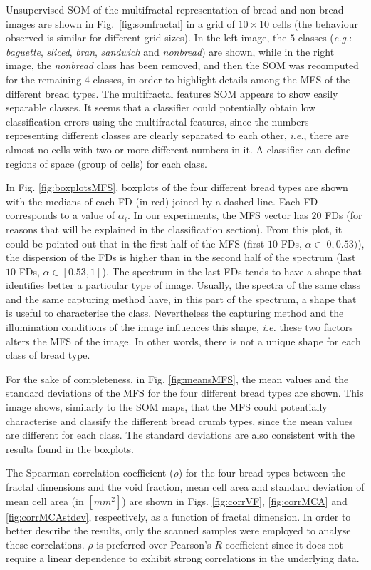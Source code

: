 \documentclass[twocolumn]{bmcart}%
\begin{document}
Unsupervised SOM of the multifractal representation of bread and non-bread images are shown in Fig.~\ref{fig:somfractal} in a grid of $10\times10$ cells (the behaviour observed is similar for different grid sizes). In the left image, the $5$ classes ({\em e.g.}: {\em baguette}, {\em sliced}, {\em bran}, {\em sandwich} and {\em nonbread}) are shown, while in the right image, the {\em nonbread} class has been removed, and then the SOM was recomputed for the remaining $4$ classes, in order to highlight details among the MFS of the different bread types. The multifractal features SOM appears to show easily separable classes. It seems that a classifier could potentially obtain low classification errors using the multifractal features, since the numbers representing different classes are clearly separated to each other, {\em i.e.}, there are almost no cells with two or more different numbers in it. A classifier can define regions of space (group of cells) for each class.

In Fig. \ref{fig:boxplotsMFS}, boxplots of the four different bread types are shown with the medians of each FD (in red) joined by a dashed line. Each FD corresponds to a value of $\alpha_{i}$. In our experiments, the MFS vector has $20$ FDs (for reasons that will be explained in the classification section). From this plot, it could be pointed out that in the first half of the MFS (first $10$ FDs, $\alpha \in [0,0.53)$), the dispersion of the FDs is higher than in the second half of the spectrum (last $10$ FDs, $\alpha \in [0.53,1]$). The spectrum in the last FDs tends to have a shape that identifies better a particular type of image. Usually, the spectra of the same class and the same capturing method have, in this part of the spectrum, a shape that is useful to characterise the class. Nevertheless the capturing method and the illumination conditions of the image influences this shape, {\em i.e.} these two factors alters the MFS of the image. In other words, there is not a unique shape for each class of bread type.

For the sake of completeness, in Fig. \ref{fig:meansMFS}, the mean values and the standard deviations of the MFS for the four different bread types are shown. This image shows, similarly to the SOM maps, that the MFS could potentially characterise and classify the different bread crumb types, since the mean values are different for each class. The standard deviations are also consistent with the results found in the boxplots. 

The Spearman correlation coefficient ($\rho$) for the four bread types between the fractal dimensions and the void fraction, mean cell area and standard deviation of mean cell area (in $[mm^{2}]$) are shown in Figs. \ref{fig:corrVF}, \ref{fig:corrMCA} and \ref{fig:corrMCAstdev}, respectively, as a function of fractal dimension. In order to better describe the results, only the scanned samples were employed to analyse these correlations. $\rho$ is preferred over Pearson's $R$ coefficient since it does not require a linear dependence to exhibit strong correlations in the underlying data.
\end{document}

